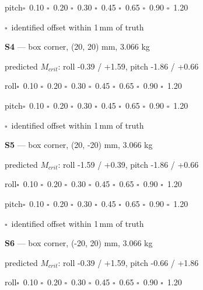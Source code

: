 \documentclass[10pt]{article}
\begin{document}
\hspace*{6mm}pitch\quad $\square$~0.10 \quad $\square$~0.20 \quad $\square$~0.30 \quad $\square$~0.45 \quad $\square$~0.65 \quad $\square$~0.90 \quad $\square$~1.20\par
\hspace*{6mm}$\square$~identified offset within 1\,mm of truth\par\medskip
\textbf{S4} --- box corner, (20, 20) mm, 3.066 kg\par
\hspace*{6mm}\footnotesize predicted $M_{crit}$: roll -0.39 / +1.59, pitch -1.86 / +0.66\normalsize\par
\hspace*{6mm}roll\quad $\square$~0.10 \quad $\square$~0.20 \quad $\square$~0.30 \quad $\square$~0.45 \quad $\square$~0.65 \quad $\square$~0.90 \quad $\square$~1.20\par
\hspace*{6mm}pitch\quad $\square$~0.10 \quad $\square$~0.20 \quad $\square$~0.30 \quad $\square$~0.45 \quad $\square$~0.65 \quad $\square$~0.90 \quad $\square$~1.20\par
\hspace*{6mm}$\square$~identified offset within 1\,mm of truth\par\medskip
\textbf{S5} --- box corner, (20, -20) mm, 3.066 kg\par
\hspace*{6mm}\footnotesize predicted $M_{crit}$: roll -1.59 / +0.39, pitch -1.86 / +0.66\normalsize\par
\hspace*{6mm}roll\quad $\square$~0.10 \quad $\square$~0.20 \quad $\square$~0.30 \quad $\square$~0.45 \quad $\square$~0.65 \quad $\square$~0.90 \quad $\square$~1.20\par
\hspace*{6mm}pitch\quad $\square$~0.10 \quad $\square$~0.20 \quad $\square$~0.30 \quad $\square$~0.45 \quad $\square$~0.65 \quad $\square$~0.90 \quad $\square$~1.20\par
\hspace*{6mm}$\square$~identified offset within 1\,mm of truth\par\medskip
\textbf{S6} --- box corner, (-20, 20) mm, 3.066 kg\par
\hspace*{6mm}\footnotesize predicted $M_{crit}$: roll -0.39 / +1.59, pitch -0.66 / +1.86\normalsize\par
\hspace*{6mm}roll\quad $\square$~0.10 \quad $\square$~0.20 \quad $\square$~0.30 \quad $\square$~0.45 \quad $\square$~0.65 \quad $\square$~0.90 \quad $\square$~1.20\par
\end{document}
